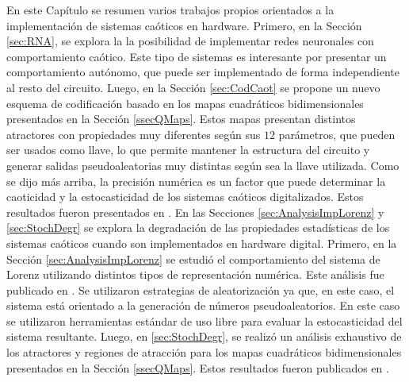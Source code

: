 En este Capítulo se resumen varios trabajos propios orientados a la implementación de sistemas caóticos en hardware.
Primero, en la Sección \ref{sec:RNA}, se explora la la posibilidad de implementar redes neuronales con comportamiento caótico.
Este tipo de sistemas es interesante por presentar un comportamiento autónomo, que puede ser implementado de forma independiente al resto del circuito.
Luego, en la Sección \ref{sec:CodCaot} se propone un nuevo esquema de codificación basado en los mapas cuadráticos bidimensionales presentados en la Sección \ref{ssecQMaps}.
Estos mapas presentan distintos atractores con propiedades muy diferentes según sus $12$ parámetros, que pueden ser usados como llave, lo que permite mantener la estructura del circuito y generar salidas pseudoaleatorias muy distintas según sea la llave utilizada.
Como se dijo más arriba, la precisión numérica es un factor que puede determinar la caoticidad y la estocasticidad de los sistemas caóticos digitalizados.
Estos resultados fueron presentados en \cite{Antonelli2012}.
En las Secciones \ref{sec:AnalysisImpLorenz} y \ref{sec:StochDegr} se explora la degradación de las propiedades estadísticas de los sistemas caóticos cuando son implementados en hardware digital.
Primero, en la Sección \ref{sec:AnalysisImpLorenz} se estudió el comportamiento del sistema de Lorenz utilizando distintos tipos de representación numérica.
Este análisis fue publicado en \cite{CAMTA2012}.
Se utilizaron estrategias de aleatorización ya que, en este caso, el sistema está orientado a la generación de números pseudoaleatorios.
En este caso se utilizaron herramientas estándar de uso libre para evaluar la estocasticidad del sistema resultante.
Luego, en \ref{sec:StochDegr}, se realizó un análisis exhaustivo de los atractores y regiones de atracción para los mapas cuadráticos bidimensionales presentados en la Sección \ref{ssecQMaps}.
Estos resultados fueron publicados en \cite{DeMicco2017}.